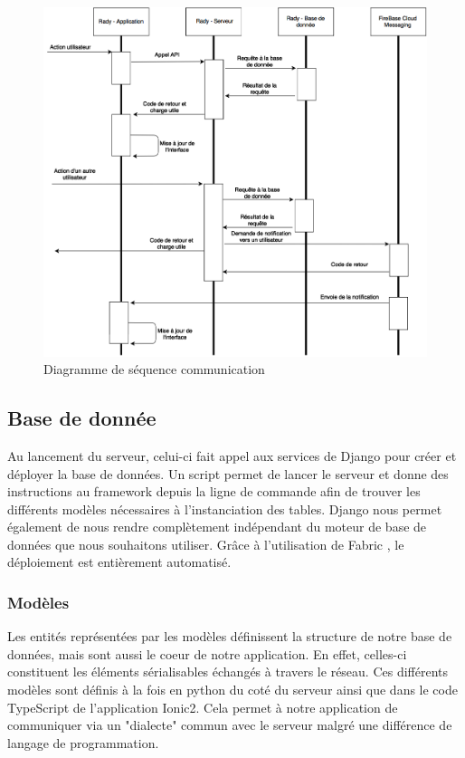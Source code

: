 \documentclass[french]{article}
\begin{document}
	\begin{figure}[H]
		\centering
		\includegraphics[scale=0.5]{../schema/schema-sequence-communication.png}
		\caption{Diagramme de séquence communication}
		\label{Diagramme de séquence communication}
	\end{figure}
	
	\newpage
	
	\subsection{Base de donnée}	
	Au lancement du serveur, celui-ci fait appel aux services de Django pour créer et déployer la base de données. Un script permet de lancer le serveur et donne des instructions au framework depuis la ligne de commande afin de trouver les différents modèles nécessaires à l'instanciation des tables.
	Django nous permet également de nous rendre complètement indépendant du moteur de base de données que nous souhaitons utiliser.
	Grâce à l'utilisation de Fabric \cite{fabric}, le déploiement est entièrement automatisé.
	\subsubsection{Modèles}
	
	Les entités représentées par les modèles définissent la structure de notre base de données, mais sont aussi le coeur de notre application. 
	En effet, celles-ci constituent les éléments sérialisables échangés à travers le réseau. 
	Ces différents modèles sont définis à la fois en python du coté du serveur ainsi que dans le code TypeScript de l'application Ionic2. Cela permet à notre application de communiquer via un "dialecte" commun avec le serveur malgré une différence de langage de programmation.
\end{document}
